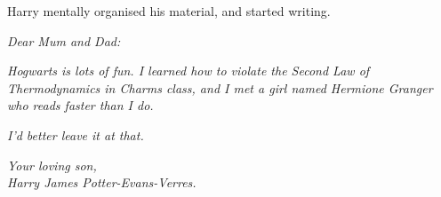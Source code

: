 Harry mentally organised his material, and started writing.

\emph{Dear Mum and Dad:}

\emph{Hogwarts is lots of fun. I learned how to violate the Second Law
of Thermodynamics in Charms class, and I met a girl named Hermione
Granger who reads faster than I do.}

\emph{I'd better leave it at that.}

\emph{Your loving son,\\Harry James Potter-Evans-Verres.}
